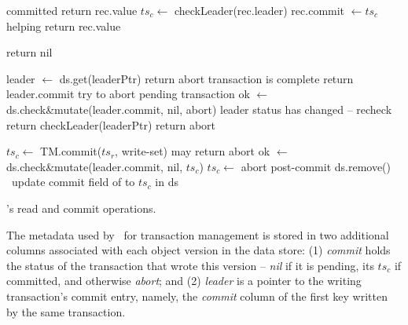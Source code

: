 \begin{algorithm}[t]
  \begin{algorithmic}
    \small
		 \Comment committed
     			   \State return rec.value \EndIf
 			\State $ts_c \leftarrow$ {\sc checkLeader}(rec.leader)
   			\State rec.commit $\leftarrow ts_c$ \Comment helping 
 			   \State return  rec.value \EndIf
      		\EndIf
      		


      \EndFor
      \State  return nil
      \EndProcedure

\Statex

      			\State leader $\leftarrow$ ds.get(leaderPtr)
     			  return abort \EndIf
		     	  \Comment transaction is complete
		     	 	\State return leader.commit 
		     	 \EndIf
		     	 \Comment try to abort pending transaction 
			\State ok $\leftarrow$ ds.check\&mutate(leader.commit, nil, abort)
			 \Comment leader status has changed -- recheck  
				\State return  {\sc checkLeader}({leaderPtr}) \EndIf
			\State return abort
	   	\EndProcedure

\Statex

      
      	\State $ts_c \leftarrow$ TM.commit($ts_r$, write-set) \Comment may return abort
	      	 \State  ok $\leftarrow$ ds.check\&mutate(leader.commit, nil,  $ts_c$)
   		 $ts_c \leftarrow$ abort \EndIf
	\EndIf
	\State \Comment post-commit
			 ds.remove()  	
			\Else\ update  commit field of  to $ts_c$  in ds%
			\EndIf
	\EndFor
\EndProcedure
      
  \end{algorithmic}
  \caption{\sys's read and commit operations.} 
  \label{fig:get-pseudocode}
\end{algorithm} 

The metadata used by \sys\ for transaction management is stored in two additional columns associated with each object version in the data store:
(1) \emph{commit} holds the status of the transaction that wrote this version -- \emph{nil} if it is pending, its  $ts_c$ if committed, and 
otherwise \emph{abort}; 
and
(2) \emph{leader} is a pointer to the writing transaction's commit entry, namely, the \emph{commit} column of the first key written by the same
transaction. 


